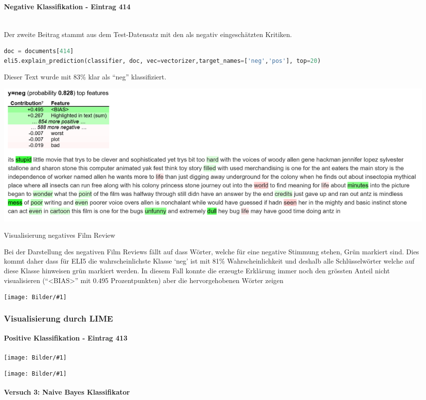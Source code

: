 \documentclass[
  12pt, %
  a4paper, %
  oneside, %
  openany, 
  numbers=noenddot, %
  BCOR=5mm, %
  parskip=half*, %
  thesis, %
]{bfhbook}
\newcommand{\parag}[1]{\paragraph*{#1}\mbox{}\\}
\newcommand{\imgText}[3]{
\begin{center}
    \begin{minipage}[t]{0.6\textwidth}
    		\vspace{0pt}
		\texttt{[image: Bilder/\#1]}
		\caption{#2}
	\end{minipage}\hfill
    \begin{minipage}[t]{0.4\textwidth}
    		\vspace{5pt}
  		#3
    \end{minipage}
\end{center}
}
\begin{document}
\parag{Negative Klassifikation - Eintrag 414}
Der zweite Beitrag stammt aus dem Test-Datensatz mit den als negativ eingeschätzten Kritiken.
\begin{lstlisting}[language=Python]
doc = documents[414]
eli5.explain_prediction(classifier, doc, vec=vectorizer,target_names=['neg','pos'], top=20)
\end{lstlisting}
\label{eli5414}
Dieser Text wurde mit 83\% klar als ``neg'' klassifiziert.
\begin{center}
\begin{minipage}[t]{\linewidth}
\includegraphics[width=\textwidth]{Bilder/MovieReviews-SentimentClassification_ELI5-414.PNG}
\caption{Visualisierung negatives Film Review}
\end{minipage}
\end{center}
Bei der Darstellung des negativen Film Reviews fällt auf dass Wörter, welche für eine negative Stimmung stehen, Grün markiert sind. Dies kommt daher dass für ELI5 die wahrscheinlichste Klasse `neg' ist mit 81\% Wahrscheinlichkeit und deshalb alle Schlüsselwörter welche auf diese Klasse hinweisen grün markiert werden. In diesem Fall konnte die erzeugte Erklärung immer noch den grössten Anteil nicht visualisieren (``<BIAS>'' mit 0.495 Prozentpunkten) aber die hervorgehobenen Wörter zeigen 

\imgText{MovieReview-DT-Accuracy.PNG}{}{}

\subsubsection*{Visualisierung durch LIME}
\paragraph*{Positive Klassifikation - Eintrag 413}


\imgText{MovieReview-DecisionTree-Display-413.PNG}{}{
}

\imgText{MovieReview-DecisionTree-Display-414.PNG}{}{
}

\parag{Versuch 3: Naive Bayes Klassifikator}
\end{document}
